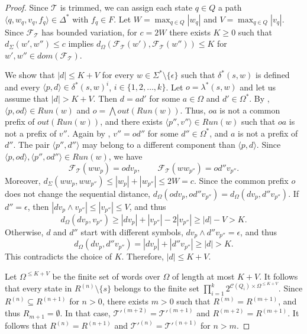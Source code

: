 \begin{proof}
  Since $\mathcal{T}$ is trimmed, we can assign each state $q \in Q$ a path $\langle
  q, w_q, v_q, f_q \rangle \in \Delta^*$ with $f_q \in F$. Let $W = \max_{q \in Q}
  |w_q|$ and $V = \max_{q \in Q} |v_q|$. Since $\mathcal{F}_\mathcal{T}$ has bounded
  variation, for $c = 2W$ there exists $K \geq 0$ such that $d_\Sigma(w', w'') \leq
  c$ implies $d_\Omega(\mathcal{F}_\mathcal{T}(w'), \mathcal{F}_\mathcal{T}(w'')) \leq
  K$ for $w', w'' \in dom(\mathcal{F}_\mathcal{T})$.

  We show that $|d| \leq K + V$ for every $w \in \Sigma^* \setminus \{ \epsilon \}$
  such that $\delta^*(s, w)$ is defined and every $\langle p, d \rangle \in
  \delta^*(s, w)^i$, $i \in \{ 1, 2, \ldots, k \}$. Let $o = \lambda^*(s, w)$ and let
  us assume that $|d| > K + V$. Then $d = ad'$ for some $a \in \Omega$ and $d' \in
  \Omega^*$. By , $\langle p, od \rangle \in Run(w)$
  and $o = \bigwedge out(Run(w))$. Thus, $oa$ is not a common prefix of $out(Run(w))$,
  and there exists $\langle p'', v'' \rangle \in Run(w)$ such that $oa$ is not a
  prefix of $v''$. Again by , $v'' = od''$ for some
  $d'' \in \Omega^*$, and $a$ is not a prefix of $d''$. The pair $\langle p'', d''
  \rangle$ may belong to a different component than $\langle p, d \rangle$. Since
  $\langle p, od \rangle, \langle p'', od'' \rangle \in Run(w)$, we have
  \begin{equation*}
    \mathcal{F}_\mathcal{T}(ww_p) = odv_p, \qquad \mathcal{F}_\mathcal{T}(ww_{p''}) =
    od''v_{p''}.
  \end{equation*}
  Moreover, $d_\Sigma(ww_p, ww_{p''}) \leq |w_p| + |w_{p''}| \leq 2W = c$. Since the
  common prefix $o$ does not change the sequential distance,
  $d_\Omega(odv_p, od''v_{p''}) = d_\Omega(dv_p, d''v_{p''})$. If $d'' = \epsilon$,
  then $|dv_p \wedge v_{p''}| \leq |v_{p''}| \leq V$, and thus
  \begin{equation*}
    d_\Omega(dv_p, v_{p''}) \geq |dv_p| + |v_{p''}| - 2|v_{p''}| \geq |d| - V > K.
  \end{equation*}
  Otherwise, $d$ and $d''$ start with different symbols, $dv_p \wedge d''v_{p''} =
  \epsilon$, and thus
  \begin{equation*}
    d_\Omega(dv_p, d''v_{p''}) = |dv_p| + |d''v_{p''}| \geq |d| > K.
  \end{equation*}
  This contradicts the choice of $K$. Therefore, $|d| \leq K + V$.

  Let $\Omega^{\leq K+V}$ be the finite set of words over $\Omega$ of length at most $K
  + V$. It follows that every state in $R^{(n)} \setminus \{ s \}$ belongs to the
  finite set $\prod_{i=1}^k 2^{\mathcal{C}(Q_i) \times \Omega^{\leq K+V}}$. Since
  $R^{(n)} \subseteq R^{(n+1)}$ for $n > 0$, there exists $m > 0$ such that $R^{(m)} =
  R^{(m+1)}$, and thus $R_{m+1} = \emptyset$. In that case, $\mathcal{T}'^{(m+2)} =
  \mathcal{T}'^{(m+1)}$ and $R^{(m+2)} = R^{(m+1)}$. It follows that $R^{(n)} =
  R^{(n+1)}$ and $\mathcal{T}'^{(n)} = \mathcal{T}'^{(n+1)}$ for $n > m$.
\end{proof}

